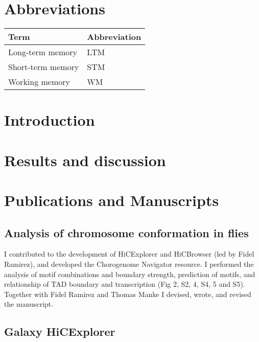 \documentclass[11pt,twoside]{MPIthesis}
\begin{document}
\chapter*{Abbreviations}\label{abbreviations}
\begin{tabular}{ll}
\toprule
Term & Abbreviation\\
\midrule
Long-term memory & LTM\\
Short-term memory & STM\\
Working memory & WM\\
\bottomrule
\end{tabular}
\chapter{Introduction}\label{introduction}

\chapter{Results and discussion}\label{results-and-discussion}

\appendix

\chapter{Publications and
Manuscripts}\label{publications-and-manuscripts}

\section{Analysis of chromosome conformation in
flies}\label{analysis-of-chromosome-conformation-in-flies}

I contributed to the development of HiCExplorer and HiCBrowser (led by
Fidel Ramirez), and developed the Chorogenome Navigator resource. I
performed the analysis of motif combinations and boundary strength,
prediction of motifs, and relationship of TAD boundary and transcription
(Fig 2, S2, 4, S4, 5 and S5). Together with Fidel Ramirez and Thomas
Manke I devised, wrote, and revised the manuscript.





\section{Galaxy HiCExplorer}\label{galaxy-hicexplorer}
\end{document}
